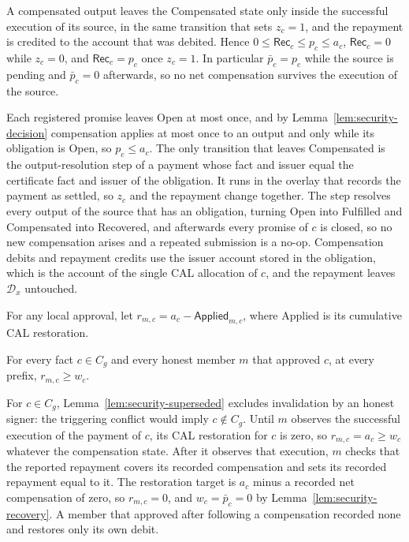 \begin{lemma}
\label{lem:security-recovery}
A compensated output leaves the Compensated state only inside the successful
execution of its source, in the same transition that sets $z_c=1$, and
the repayment is credited to the account that was debited. Hence
$0\le\mathsf{Rec}_c\le p_c\le a_c$, $\mathsf{Rec}_c=0$ while $z_c=0$,
and $\mathsf{Rec}_c=p_c$ once $z_c=1$. In particular $\bar p_c=p_c$ while
the source is pending and $\bar p_c=0$ afterwards, so no net compensation
survives the execution of the source.
\end{lemma}
\begin{IEEEproof}
Each registered promise leaves Open at most once, and by Lemma~\ref{lem:security-decision} compensation applies at most once to an output and only while its obligation is Open, so $p_c\le a_c$. The only transition that leaves Compensated is the output-resolution step of a payment whose fact and issuer equal the certificate fact and issuer of the obligation. It runs in the overlay that records the payment as settled, so $z_c$ and the repayment change together. The step resolves every output of the source that has an obligation, turning Open into Fulfilled and Compensated into Recovered, and afterwards every promise of $c$ is closed, so no new compensation arises and a repeated submission is a no-op. Compensation debits and repayment credits use the issuer account stored in the obligation, which is the account of the single CAL allocation of $c$, and the repayment leaves $\mathcal D_x$ untouched.
\end{IEEEproof}

For any local approval, let $r_{m,c}=a_c-\mathsf{Applied}_{m,c}$, where Applied is its cumulative CAL restoration.

\begin{lemma}
\label{lem:security-witness}
For every fact $c\in C_g$ and every honest member $m$ that approved $c$,
at every prefix,
$r_{m,c}\ge w_c$.
\end{lemma}
\begin{IEEEproof}
For $c\in C_g$, Lemma~\ref{lem:security-superseded} excludes invalidation by an honest signer: the triggering conflict would imply $c\notin C_g$.
Until $m$ observes the successful execution of the payment of $c$, its CAL restoration for $c$ is zero, so $r_{m,c}=a_c\ge w_c$ whatever the compensation state. After it observes that execution, $m$ checks that the reported repayment covers its recorded compensation and sets its recorded repayment equal to it. The restoration target is $a_c$ minus a recorded net compensation of zero, so $r_{m,c}=0$, and $w_c=\bar p_c=0$ by Lemma~\ref{lem:security-recovery}. A member that approved after following a compensation recorded none and restores only its own debit.
\end{IEEEproof}

